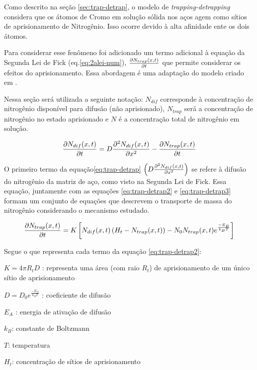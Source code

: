 Como descrito na seção \autoref{sec:trap-detrap}, o modelo de \textit{trapping-detrapping} considera que os átomos de Cromo em solução sólida nos aços agem como sítios de aprisionamento de Nitrogênio. Isso ocorre devido à alta afinidade ente os dois átomos.

Para considerar esse fenômeno foi adicionado um termo adicional à equação da Segunda Lei de Fick (eq.\autoref{eq:2alei-num}), $\pdv{N_{trap}(x,t)}{t}$ que permite considerar os efeitos do aprisionamento. Essa abordagem é uma adaptação do modelo criado em \cite{moskalioviene2011modeling}.

Nessa seção será utilizada a seguinte notação: $N_{dif}$ corresponde à concentração de nitrogênio disponível para difusão (não aprisionado), $N_{trap}$ será a concentração de nitrogênio no estado aprisionado e $N$ é a concentração total de nitrogênio em solução.

\begin{equation}
\label{eq:trap-detrap}
\pdv{N_{dif}(x,t)}{t} = D\pdv[2]{N_{dif}(x,t)}{x} - \pdv{N_{trap}(x,t)}{t} 
\end{equation}

O primeiro termo da equação\autoref{eq:trap-detrap} $\left(D\pdv[2]{N_{dif}(x,t)}{x}\right)$ se refere à difusão do nitrogênio da matriz de aço, como visto na Segunda Lei de Fick. Essa equação, juntamente com as equações \autoref{eq:trap-detrap2} e \autoref{eq:trap-detrap3} formam um conjunto de equações que descrevem o transporte de massa do nitrogênio considerando o mecanismo estudado.

\begin{equation}
\label{eq:trap-detrap2}
\pdv{N_{trap}(x,t)}{t} = K\left[N_{dif}(x,t)\left(H_t-N_{trap}(x,t)\right) - N_0 N_{trap}(x,t)e^{\frac{-E_B}{k_BT}}\right] 
\end{equation}

Segue o que representa cada termo da equação \autoref{eq:trap-detrap2}:

$K=4{\pi}R_tD$ : representa uma área (com raio $R_t$) de aprisionamento de um único sítio de aprisionamento

$D=D_0e^{\frac{-E_A}{k_BT}}$ : coeficiente de difusão 

$E_A$ : energia de ativação de difusão

$k_B$: constante de Boltzmann 
	
$T$: temperatura

$H_t$: concentração de sítios de aprisionamento

